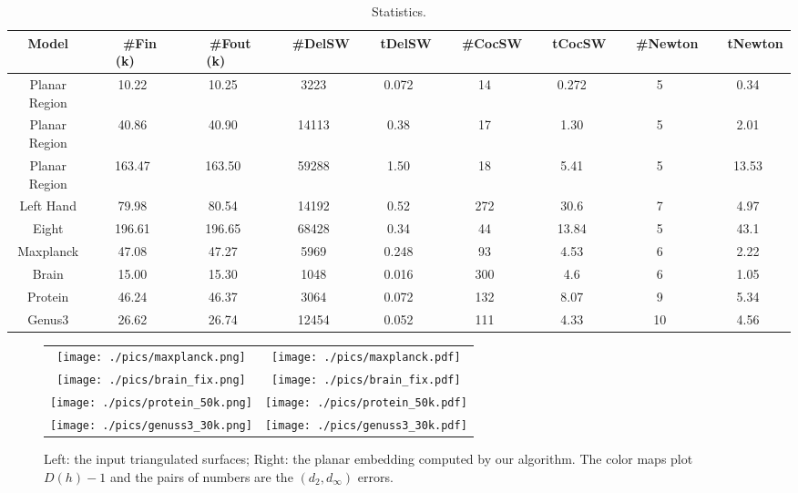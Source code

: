 \documentclass[11pt]{article}
\begin{document}
\begin{table}[htbp]
\begin{center}
\begin{tabular}{| c | c | c | c | c | c|c|c|c|}
\hline
Model       & ~~\#Fin (k)~~ &  ~~\#Fout (k)~~ & ~~\#DelSW~~ & ~~tDelSW~~ &~~\#CocSW~~ & ~~tCocSW~~ & ~~\#Newton~~ & ~~tNewton~~   \\
\hline
{Planar Region} & 10.22	& 10.25   	  & 3223    & 0.072  & 14      & 0.272  & 5        & 0.34\\
\hline
{Planar Region} & 40.86	& 40.90   	  & 14113   & 0.38   & 17      & 1.30   & 5        & 2.01\\
\hline
{Planar Region} & 163.47	& 163.50   & 59288   & 1.50   & 18      & 5.41   & 5        & 13.53\\
\hline
{Left Hand} & 79.98	& 80.54   	  & 14192   & 0.52   & 272     & 30.6   & 7        & 4.97\\
\hline
{Eight} & 196.61	& 196.65   	  & 68428   & 0.34   & 44     & 13.84   & 5        & 43.1\\
\hline
{Maxplanck} & 47.08 		& 47.27   	  & 5969    & 0.248  & 93      & 4.53   & 6        & 2.22\\
\hline
{Brain} 	 	& 15.00	& 15.30   	  & 1048   & 0.016   & 300     & 4.6   & 6        & 1.05\\
\hline
{Protein} 	 	& 46.24	&  46.37  	  & 3064   & 0.072   & 132     & 8.07   & 9        & 5.34\\
\hline
{Genus3} 	 	& 26.62	&  26.74  	  & 12454   & 0.052   & 111     & 4.33   & 10        & 4.56\\
\hline
\end{tabular}
\end{center}
\caption{Statistics.
\label{tbl:statistics}
}
\end{table}

\begin{figure}[!t]
\begin{center}
\begin{tabular}{cc}
\texttt{[image: ./pics/maxplanck.png]} & 
\texttt{[image: ./pics/maxplanck.pdf]} \\
\texttt{[image: ./pics/brain\_fix.png]} & 
\texttt{[image: ./pics/brain\_fix.pdf]} \\
\texttt{[image: ./pics/protein\_50k.png]} & 
\texttt{[image: ./pics/protein\_50k.pdf]} \\
\texttt{[image: ./pics/genuss3\_30k.png]} & 
\texttt{[image: ./pics/genuss3\_30k.pdf]} \\
\end{tabular}
\end{center}
\caption{Left: the input triangulated surfaces; Right: the planar embedding 
computed by our algorithm. The color maps plot $D(h) - 1$ and the pairs of numbers
are the $(d_2, d_\infty)$ errors. 
\label{fig:more_examples}}
\end{figure}
\end{document}
